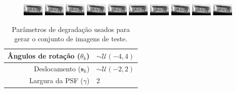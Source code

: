 \begin{figure}[H]
	\includegraphics{figures/degradedImg2/result-10.png}
	\includegraphics{figures/degradedImg2/result-11.png}
	\includegraphics{figures/degradedImg2/result-12.png}
	\includegraphics{figures/degradedImg2/result-13.png}
	\includegraphics{figures/degradedImg2/result-14.png}
	\includegraphics{figures/degradedImg2/result-15.png}
	\includegraphics{figures/degradedImg2/result-16.png}
	\includegraphics{figures/degradedImg2/result-17.png}
	\includegraphics{figures/degradedImg2/result-18.png}
	\includegraphics{figures/degradedImg2/result-19.png}
	
\end{figure}

\begin{table}[h]
	\centering
	\caption{Parâmetros de degradação usados para gerar o conjunto de imagens de teste.}
	\label{tab:resumoParametros}
	\begin{tabular}{r | l}
		Ângulos de rotação ($\theta_k$) & $ \sim \mathcal{U}(-4, 4)$ \\ \hline
		Deslocamento ($\mathbf{s}_k$)& $\sim \mathcal{U}(-2,2)$\\ \hline
		Largura da PSF ($\gamma$) & 2 \\ 

	\end{tabular}
\end{table}

